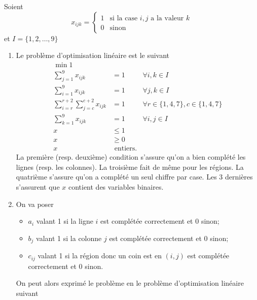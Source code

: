 \begin{enumerate}
\begin{enumerate}
    \end{enumerate}

    \begin{solution}
      Soient
      \[ x_{ijk} =
        \begin{cases}
          1 & \text{si la case }i, j\text{ a la valeur }k\\
          0 & \text{sinon}
        \end{cases}
      \]
      et $I = \{1,2,\ldots,9\}$
      \begin{enumerate}
        \item Le problème d'optimisation linéaire est le suivant
          \begin{align*}
            \min 1\\
            \sum_{j=1}^9 x_{ijk} & = 1 & \forall i,k \in I\\
            \sum_{i=1}^9 x_{ijk} & = 1 & \forall j,k \in I\\
            \sum_{i=r}^{r+2}\sum_{j=c}^{c+2} x_{ijk} & = 1
            & \forall r \in \{1,4,7\}, c \in \{1,4,7\}\\
            \sum_{k=1}^9 x_{ijk} & = 1 & \forall i,j \in I\\
            x & \leq 1\\
            x & \geq 0\\
            x & \text{ entiers}.
          \end{align*}
          La première (resp. deuxième) condition s'assure qu'on a bien complété
          les lignes (resp. les colonnes).
          La troisième fait de même pour les régions.
          La quatrième s'assure qu'on a complété un seul chiffre par
          case.
          Les 3 dernières s'assurent que $x$ contient des variables binaires.
        \item
          On va poser
          \begin{itemize}
            \item $a_i$ valant 1 si la ligne $i$ est complétée correctement
              et 0 sinon;
            \item $b_j$ valant 1 si la colonne $j$ est complétée correctement
              et 0 sinon;
            \item $c_{ij}$ valant 1 si la région donc un coin est en
              $(i,j)$ est complétée correctement
              et 0 sinon.
          \end{itemize}
          On peut alors exprimé le problème en le problème d'optimisation
          linéaire suivant
          \begin{align*}

\end{align*}
\end{enumerate}
\end{solution}
\end{enumerate}

